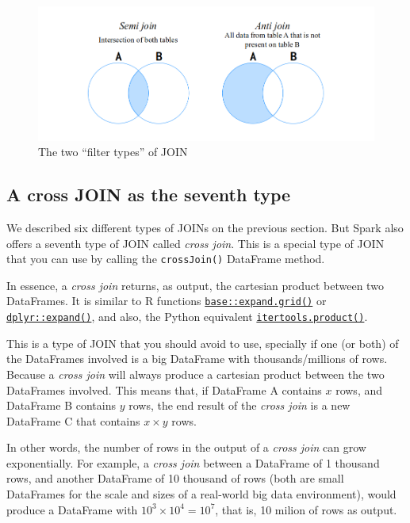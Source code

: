 \documentclass[
  11pt,
  letterpaper,
  DIV=11,
  numbers=noendperiod]{scrreprt}
\begin{document}
\begin{figure}

{\centering \includegraphics{Chapters/./../Figures/join-sets2.png}

}

\caption{\label{fig-join-sets2}The two ``filter types'' of JOIN}

\end{figure}

\hypertarget{a-cross-join-as-the-seventh-type}{%
\subsection{A cross JOIN as the seventh
type}\label{a-cross-join-as-the-seventh-type}}

We described six different types of JOINs on the previous section. But
Spark also offers a seventh type of JOIN called \emph{cross join}. This
is a special type of JOIN that you can use by calling the
\texttt{crossJoin()} DataFrame method.

In essence, a \emph{cross join} returns, as output, the cartesian
product between two DataFrames. It is similar to R functions
\href{https://www.rdocumentation.org/packages/base/versions/3.6.2/topics/expand.grid}{\texttt{base::expand.grid()}}
or
\href{https://tidyr.tidyverse.org/reference/expand.html}{\texttt{dplyr::expand()}},
and also, the Python equivalent
\href{https://docs.python.org/2/library/itertools.html\#itertools.product}{\texttt{itertools.product()}}.

This is a type of JOIN that you should avoid to use, specially if one
(or both) of the DataFrames involved is a big DataFrame with
thousands/millions of rows. Because a \emph{cross join} will always
produce a cartesian product between the two DataFrames involved. This
means that, if DataFrame A contains \(x\) rows, and DataFrame B contains
\(y\) rows, the end result of the \emph{cross join} is a new DataFrame C
that contains \(x \times y\) rows.

In other words, the number of rows in the output of a \emph{cross join}
can grow exponentially. For example, a \emph{cross join} between a
DataFrame of 1 thousand rows, and another DataFrame of 10 thousand of
rows (both are small DataFrames for the scale and sizes of a real-world
big data environment), would produce a DataFrame with
\(10^3 \times 10^4 = 10^7\), that is, 10 milion of rows as output.
\end{document}
